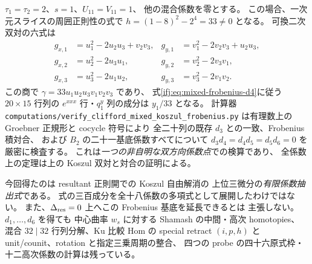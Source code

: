 \begin{example}[双方向混合の非自明な有理係数検算]
\label{ifj:ex:mixed-frobenius-numeric}
$\tau_1=\tau_2=2$、$s=1$、$U_{11}=V_{11}=1$、
他の混合係数を零とする。
この場合、一次元スライスの周囲正則性の式で
$h=(1-8)^2-2^4=33\ne0$ となる。
可換二次双対の六式は
\[
 \begin{aligned}
 g_{x,1}&=u_1^2-2u_2u_3+v_2v_3,&
 g_{y,1}&=v_1^2-2v_2v_3+u_2u_3,\\
 g_{x,2}&=u_2^2-2u_3u_1,&
 g_{y,2}&=v_2^2-2v_3v_1,\\
 g_{x,3}&=u_3^2-2u_1u_2,&
 g_{y,3}&=v_3^2-2v_1v_2.
 \end{aligned}
\]
この商で $\gamma=33u_1u_2u_3v_1v_2v_3$ であり、
式\eqref{ifj:eq:mixed-frobenius-d4}に従う
$20\times15$ 行列の $e^{xxx}$ 行・$q^y_1$ 列の成分は
$y_1/33$ となる。
計算器
\texttt{computations/verify\_clifford\_mixed\_koszul\_frobenius.py}
は有理数上の Groebner 正規形と cocycle 符号により
全二十列の既存 $d_3$ との一致、Frobenius 積対合、
および $B_2$ の二十一基底係数すべてについて
$d_3d_4=d_4d_5=d_5d_6=0$ を厳密に検査する。
これは\emph{一つの非自明な双方向係数点}での検算であり、
全係数上の定理は上の Koszul 双対と対合の証明による。
\end{example}

\begin{remark}
\label{ifj:rem:mixed-frobenius-scope}
今回得たのは resultant 正則開での Koszul 自由解消の
上位三微分の\emph{有限係数抽出式}である。
式の三百成分を全十八係数の多項式として展開したわけではない。
また、$\Delta_{\rm res}=0$ 上へこの Frobenius 基底を延長できるとは
主張しない。$d_1,\ldots,d_6$ を得ても
中心曲率 $w_s$ に対する Shamash の中間・高次 homotopies、
混合 $32\mid32$ 行列分解、Ku 比較 Hom の special retract
$(i,p,h)$ と unit/counit、rotation と指定三乗周期の整合、
四つの probe の四十六原式枠・十二高次係数の計算は残っている。
\end{remark}
